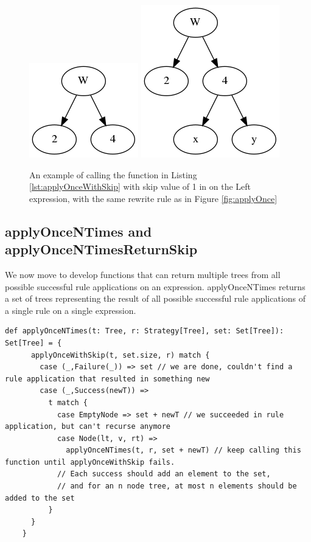 \documentclass{l4proj}
\begin{document}
\begin{figure} 
    \centering
    \includegraphics[scale=0.5]{images/Section5applyOnceWithSkip0}
    \hspace{2cm}
    \includegraphics[scale=0.5]{images/Section5applyOnceWithSkip1}
    \caption{An example of calling the function in Listing \ref{lst:applyOnceWithSkip} with skip value of 1 in on the Left expression, with the same rewrite rule as in Figure \ref{fig:applyOnce}}
    \label{fig:applyOnceWithSkip}
\end{figure}





\subsection{applyOnceNTimes and applyOnceNTimesReturnSkip}

We now move to develop functions that can return multiple trees from all possible successful rule applications on an expression. applyOnceNTimes returns a set of trees representing the result of all possible successful rule applications of a single rule on a single expression.

\begin{lstlisting}[caption={???}, label={lst:applyOnceNTimes}]
    def applyOnceNTimes(t: Tree, r: Strategy[Tree], set: Set[Tree]): Set[Tree] = {
      applyOnceWithSkip(t, set.size, r) match {
        case (_,Failure(_)) => set // we are done, couldn't find a rule application that resulted in something new
        case (_,Success(newT)) =>
          t match {
            case EmptyNode => set + newT // we succeeded in rule application, but can't recurse anymore
            case Node(lt, v, rt) =>
              applyOnceNTimes(t, r, set + newT) // keep calling this function until applyOnceWithSkip fails.
            // Each success should add an element to the set,
            // and for an n node tree, at most n elements should be added to the set
          }
      }
    }
\end{lstlisting}
\end{document}
